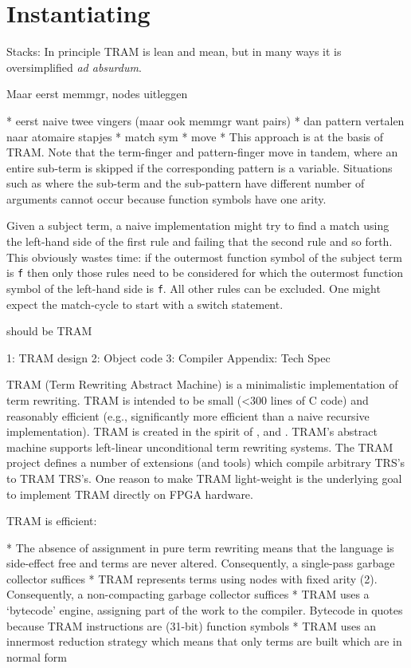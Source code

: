 \documentclass[11pt,twoside]{memoir}
\def\I{\textit} %
\def\T{\texttt}
\begin{document}
\section{Instantiating}

Stacks:
In principle TRAM is lean and mean, but in many ways it is oversimplified \I{ad absurdum}. 

Maar eerst memmgr, nodes uitleggen

* eerst naive twee vingers
(maar ook memmgr want pairs)
* dan pattern vertalen naar atomaire stapjes
	* match sym
	* move 
* 
This approach is at the basis of TRAM. Note that the term-finger and pattern-finger move in tandem, where an entire sub-term is skipped if the corresponding pattern is a variable. Situations such as where the sub-term and the sub-pattern have different number of arguments cannot occur because function symbols have one arity.

Given a subject term, a naive implementation might try to find a match using the left-hand side of the first rule and failing that the second rule and so forth. This obviously wastes time: if the outermost function symbol of the subject term is \T{f} then only those rules need to be considered for which the outermost function symbol of the left-hand side is \T{f}. All other rules can be excluded. One might expect the match-cycle to start with a switch statement.





should be TRAM

1: TRAM design
2: Object code
3: Compiler
Appendix: Tech Spec

TRAM (Term Rewriting Abstract Machine) is a minimalistic implementation of term rewriting. TRAM is intended to be small (<300 lines of C code) and reasonably efficient (e.g., significantly more efficient than a naive recursive implementation). TRAM is created in the spirit of \cite{fokkink_1998_within}, \cite{walters_1993_arm} and \cite{walters_1996_simulating}. TRAM's abstract machine supports left-linear unconditional term rewriting systems. The TRAM project defines a number of extensions (and tools) which compile arbitrary TRS's to TRAM TRS's.
One reason to make TRAM light-weight is the underlying goal to implement TRAM directly on FPGA hardware.

TRAM is efficient:

* The absence of assignment in pure term rewriting means that the language is side-effect free and terms are never altered. Consequently, a single-pass garbage collector suffices
* TRAM represents terms using nodes with fixed arity (2). Consequently, a non-compacting garbage collector suffices
* TRAM uses a `bytecode' engine, assigning part of the work to the compiler. Bytecode in quotes because TRAM instructions are (31-bit) function symbols
* TRAM uses an innermost reduction strategy which means that only terms are built which are in normal form
\end{document}
